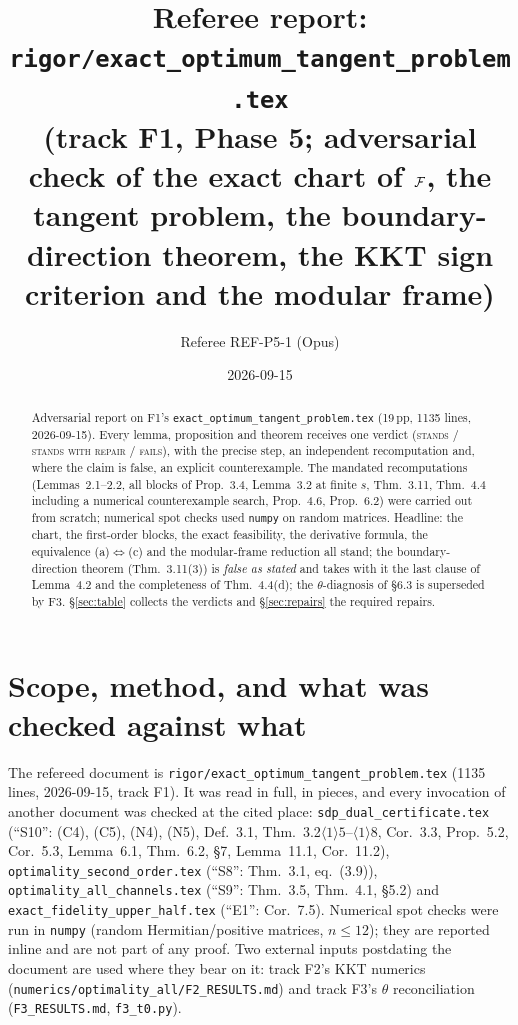 \documentclass[11pt]{article}
\title{Referee report: \texttt{rigor/exact\_optimum\_tangent\_problem.tex}\\
\large (track F1, Phase 5; adversarial check of the exact chart of $\mathcal F$, the tangent
problem, the boundary-direction theorem, the KKT sign criterion and the modular frame)}
\author{Referee REF-P5-1 (Opus)}\date{2026-09-15}
\begin{document}
\maketitle
\begin{abstract}
Adversarial report on F1's \texttt{exact\_optimum\_tangent\_problem.tex} (19\,pp, 1135
lines, 2026-09-15).  Every lemma, proposition and theorem receives one verdict
(\textsc{stands} / \textsc{stands with repair} / \textsc{fails}), with the precise step, an
independent recomputation and, where the claim is false, an explicit counterexample.  The
mandated recomputations (Lemmas~2.1--2.2, all blocks of Prop.~3.4, Lemma~3.2 at finite $s$,
Thm.~3.11, Thm.~4.4 including a numerical counterexample search, Prop.~4.6, Prop.~6.2) were
carried out from scratch; numerical spot checks used \texttt{numpy} on random matrices.
Headline: the chart, the first-order blocks, the exact feasibility, the derivative formula,
the equivalence (a)$\Leftrightarrow$(c) and the modular-frame reduction all stand; the
boundary-direction theorem (Thm.~3.11(3)) is \emph{false as stated} and takes with it the
last clause of Lemma~4.2 and the completeness of Thm.~4.4(d); the $\theta$-diagnosis of
\S6.3 is superseded by F3.  \S\ref{sec:table} collects the verdicts and \S\ref{sec:repairs}
the required repairs.
\end{abstract}
\tableofcontents

\section{Scope, method, and what was checked against what}\label{sec:scope}

The refereed document is \texttt{rigor/exact\_optimum\_tangent\_problem.tex} (1135 lines,
2026-09-15, track F1).  It was read in full, in pieces, and every invocation of another
document was checked at the cited place: \texttt{sdp\_dual\_certificate.tex} (``S10'':
(C4), (C5), (N4), (N5), Def.~3.1, Thm.~3.2$\langle1\rangle5$--$\langle1\rangle8$, Cor.~3.3,
Prop.~5.2, Cor.~5.3, Lemma~6.1, Thm.~6.2, \S7, Lemma~11.1, Cor.~11.2),
\texttt{optimality\_second\_order.tex} (``S8'': Thm.~3.1, eq.~(3.9)),
\texttt{optimality\_all\_channels.tex} (``S9'': Thm.~3.5, Thm.~4.1, \S5.2) and
\texttt{exact\_fidelity\_upper\_half.tex} (``E1'': Cor.~7.5).  Numerical spot checks were
run in \texttt{numpy} (random Hermitian/positive matrices, $n\le12$); they are reported
inline and are not part of any proof.  Two external inputs postdating the document are used
where they bear on it: track F2's KKT numerics (\texttt{numerics/optimality\_all/F2\_RESULTS.md})
and track F3's $\theta$ reconciliation (\texttt{F3\_RESULTS.md}, \texttt{f3\_t0.py}).
\end{document}
